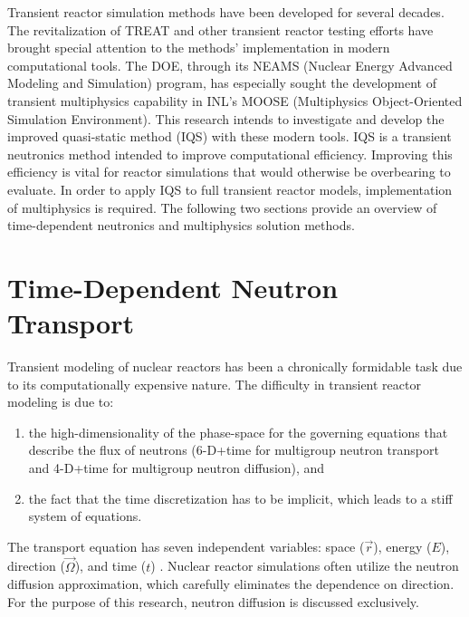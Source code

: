 Transient reactor simulation methods have been developed for several decades. The revitalization of TREAT and other transient reactor testing efforts have brought special attention to the methods' implementation in modern computational tools.  The DOE, through its NEAMS (Nuclear Energy Advanced Modeling and Simulation) program, has especially sought the development of transient multiphysics capability in INL's MOOSE (Multiphysics Object-Oriented Simulation Environment). This research intends to investigate and develop the improved quasi-static method (IQS) with these modern tools. IQS is a transient neutronics method intended to improve computational efficiency. Improving this efficiency is vital for reactor simulations that would otherwise be overbearing to evaluate. In order to apply IQS to full transient reactor models, implementation of multiphysics is required. The following two sections provide an overview of time-dependent neutronics and multiphysics solution methods. 

\section{Time-Dependent Neutron Transport}

Transient modeling of nuclear reactors has been a chronically formidable task due to its computationally expensive nature. The difficulty in transient reactor modeling is due to:
\begin{enumerate}
\item
the high-dimensionality of the phase-space for the governing equations that describe the flux of neutrons (6-D+time for multigroup neutron transport and 4-D+time for multigroup neutron diffusion), and 
\item
the fact that the time discretization has to be implicit, which  leads to a stiff system of equations.  
\end{enumerate}
The transport equation has seven independent variables: space ($\vec{r}$), energy ($E$), direction ($\vec{\Omega}$), and time ($t$) \cite{duderstadt1976nuclear}.  Nuclear reactor simulations often utilize the neutron diffusion approximation, which carefully eliminates the dependence on direction.  For the purpose of this research, neutron diffusion is discussed exclusively.

